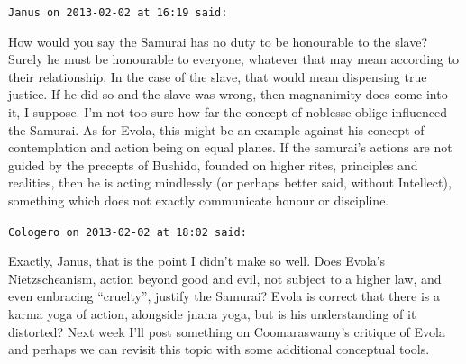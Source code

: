 \begin{footnotesize}
\begin{sffamily}
\hfill

\texttt{Janus on 2013-02-02 at 16:19 said:}

How would you say the Samurai has no duty to be honourable to the slave? Surely he must be honourable to everyone, whatever that may mean according to their relationship. In the case of the slave, that would mean dispensing true justice. If he did so and the slave was wrong, then magnanimity does come into it, I suppose. I'm not too sure how far the concept of noblesse oblige influenced the Samurai. As for Evola, this might be an example against his concept of contemplation and action being on equal planes. If the samurai's actions are not guided by the precepts of Bushido, founded on higher rites, principles and realities, then he is acting mindlessly (or perhaps better said, without Intellect), something which does not exactly communicate honour or discipline.

\hfill

\texttt{Cologero on 2013-02-02 at 18:02 said:}

Exactly, Janus, that is the point I didn't make so well. Does Evola's Nietzscheanism, action beyond good and evil, not subject to a higher law, and even embracing ``cruelty'', justify the Samurai? Evola is correct that there is a karma yoga of action, alongside jnana yoga, but is his understanding of it distorted? Next week I'll post something on Coomaraswamy's critique of Evola and perhaps we can revisit this topic with some additional conceptual tools.


\hfill

\end{sffamily}
\end{footnotesize}

